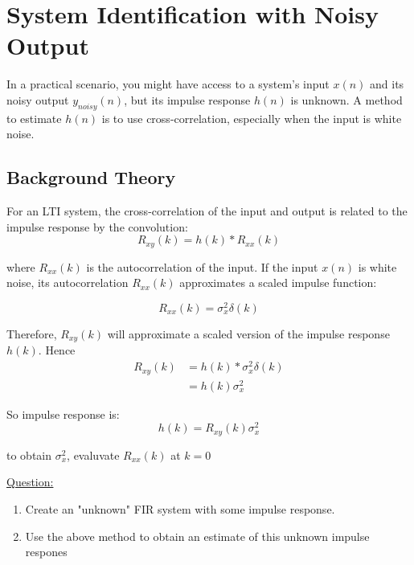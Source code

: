 \section{System Identification with Noisy Output}

In a practical scenario, you might have access to a system's input $x(n)$ and its noisy output $y_{noisy}(n)$, but its impulse response $h(n)$ is unknown. A method to estimate $h(n)$ is to use cross-correlation, especially when the input is white noise.

\subsection*{Background Theory}
For an LTI system, the cross-correlation of the input and output is related to the impulse response by the convolution:
$$R_{xy}(k)=h(k) * R_{xx}(k)$$

where $R_{xx}(k)$ is the autocorrelation of the input. If the input $x(n)$ is white noise, its autocorrelation $R_{xx}(k)$ approximates a scaled impulse function:

$$R_{xx}(k) = \sigma _x ^ 2 \delta (k)$$

Therefore, $R_{xy}(k)$ will approximate a scaled version of the impulse response $h(k)$.
Hence 
\begin{align*}
	R_{xy}(k) &=h(k) * \sigma _x ^ 2 \delta (k) \\
	 &= h(k)\sigma _x ^ 2
\end{align*}

So impulse response is: 
$$h(k) = {R_{xy}(k)}{\sigma _x ^ 2}$$

to obtain $\sigma _x ^ 2$, evaluvate $R_{xx}(k)$ at $k = 0$

\underline{Question:}
\begin{enumerate}
	\item Create an "unknown" FIR system with some impulse response.
	\item Use the above method to obtain an estimate of this unknown impulse respones
\end{enumerate}